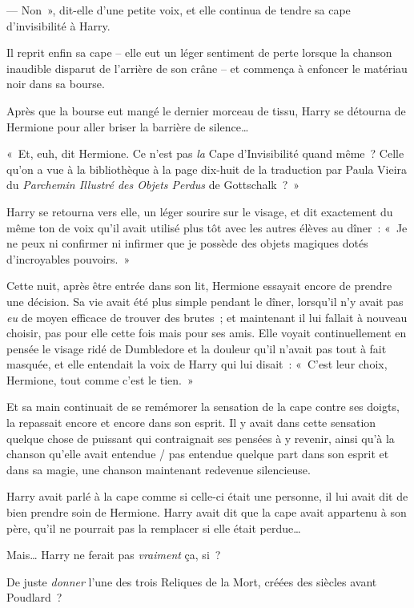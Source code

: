 --- Non~», dit-elle d'une petite voix, et elle continua de tendre sa cape d'invisibilité à Harry.

Il reprit enfin sa cape -- elle eut un léger sentiment de perte lorsque la chanson inaudible disparut de l'arrière de son crâne -- et commença à enfoncer le matériau noir dans sa bourse.

Après que la bourse eut mangé le dernier morceau de tissu, Harry se détourna de Hermione pour aller briser la barrière de silence…

«~Et, euh, dit Hermione.
Ce n'est pas \emph{la} Cape d'Invisibilité quand même~?
Celle qu'on a vue à la bibliothèque à la page dix-huit de la traduction par Paula Vieira du \emph{Parchemin Illustré des Objets Perdus} de Gottschalk~?~»

Harry se retourna vers elle, un léger sourire sur le visage, et dit exactement du même ton de voix qu'il avait utilisé plus tôt avec les autres élèves au dîner~: «~Je ne peux ni confirmer ni infirmer que je possède des objets magiques dotés d'incroyables pouvoirs.~»

\later

Cette nuit, après être entrée dans son lit, Hermione essayait encore de prendre une décision.
Sa vie avait été plus simple pendant le dîner, lorsqu'il n'y avait pas \emph{eu} de moyen efficace de trouver des brutes~; et maintenant il lui fallait à nouveau choisir, pas pour elle cette fois mais pour ses amis.
Elle voyait continuellement en pensée le visage ridé de Dumbledore et la douleur qu'il n'avait pas tout à fait masquée, et elle entendait la voix de Harry qui lui disait~: «~C'est leur choix, Hermione, tout comme c'est le tien.~»

Et sa main continuait de se remémorer la sensation de la cape contre ses doigts, la repassait encore et encore dans son esprit.
Il y avait dans cette sensation quelque chose de puissant qui contraignait ses pensées à y revenir, ainsi qu'à la chanson qu'elle avait entendue / pas entendue quelque part dans son esprit et dans sa magie, une chanson maintenant redevenue silencieuse.

Harry avait parlé à la cape comme si celle-ci était une personne, il lui avait dit de bien prendre soin de Hermione.
Harry avait dit que la cape avait appartenu à son père, qu'il ne pourrait pas la remplacer si elle était perdue…

Mais… Harry ne ferait pas \emph{vraiment} ça, si~?

De juste \emph{donner} l'une des trois Reliques de la Mort, créées des siècles avant Poudlard~?

